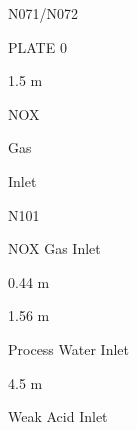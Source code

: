 \documentclass[a4paper,portrait,12pt]{article}
\begin{document}
\begin{flushleft}
N071/N072
\end{flushleft}





\begin{flushleft}
PLATE 0
\end{flushleft}


\begin{flushleft}
1.5 m
\end{flushleft}





\begin{flushleft}
NOX
\end{flushleft}


\begin{flushleft}
Gas
\end{flushleft}


\begin{flushleft}
Inlet
\end{flushleft}





\begin{flushleft}
N101
\end{flushleft}


\begin{flushleft}
NOX Gas Inlet
\end{flushleft}





\begin{flushleft}
0.44 m
\end{flushleft}





\begin{flushleft}
1.56 m
\end{flushleft}





\begin{flushleft}
Process Water Inlet
\end{flushleft}


\begin{flushleft}
4.5 m
\end{flushleft}





\begin{flushleft}
Weak Acid Inlet
\end{flushleft}
\end{document}
